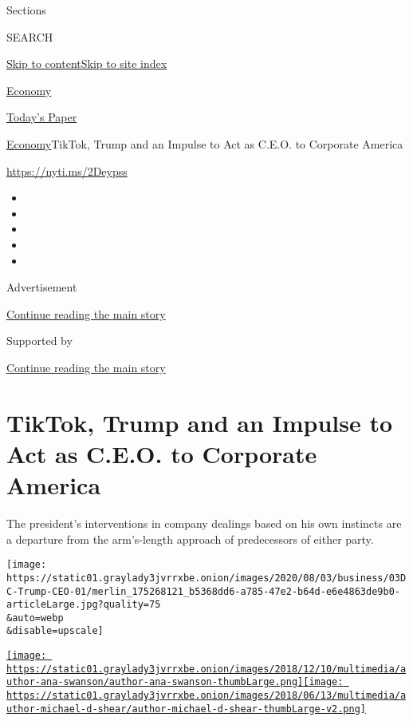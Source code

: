 Sections

SEARCH

\protect\hyperlink{site-content}{Skip to
content}\protect\hyperlink{site-index}{Skip to site index}

\href{https://www.nytimes3xbfgragh.onion/section/business/economy}{Economy}

\href{https://myaccount.nytimes3xbfgragh.onion/auth/login?response_type=cookie\&client_id=vi}{}

\href{https://www.nytimes3xbfgragh.onion/section/todayspaper}{Today's
Paper}

\href{/section/business/economy}{Economy}\textbar{}TikTok, Trump and an
Impulse to Act as C.E.O. to Corporate America

\url{https://nyti.ms/2Deypss}

\begin{itemize}
\item
\item
\item
\item
\item
\end{itemize}

Advertisement

\protect\hyperlink{after-top}{Continue reading the main story}

Supported by

\protect\hyperlink{after-sponsor}{Continue reading the main story}

\hypertarget{tiktok-trump-and-an-impulse-to-act-as-ceo-to-corporate-america}{%
\section{TikTok, Trump and an Impulse to Act as C.E.O. to Corporate
America}\label{tiktok-trump-and-an-impulse-to-act-as-ceo-to-corporate-america}}

The president's interventions in company dealings based on his own
instincts are a departure from the arm's-length approach of predecessors
of either party.

\texttt{[image: https://static01.graylady3jvrrxbe.onion/images/2020/08/03/business/03DC-Trump-CEO-01/merlin\_175268121\_b5368dd6-a785-47e2-b64d-e6e4863de9b0-articleLarge.jpg?quality=75\\\&auto=webp\\\&disable=upscale]}

\href{https://www.nytimes3xbfgragh.onion/by/ana-swanson}{\texttt{[image: https://static01.graylady3jvrrxbe.onion/images/2018/12/10/multimedia/author-ana-swanson/author-ana-swanson-thumbLarge.png]}}\href{https://www.nytimes3xbfgragh.onion/by/michael-d-shear}{\texttt{[image: https://static01.graylady3jvrrxbe.onion/images/2018/06/13/multimedia/author-michael-d-shear/author-michael-d-shear-thumbLarge-v2.png]}}


